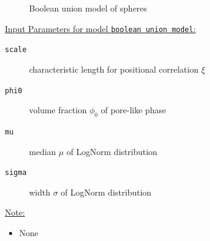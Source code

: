 \begin{figure}[htb]
\begin{center}
\hfill
{}
\end{center}
\caption{Boolean union model of spheres}
\label{fig:BooleanUnion}
\end{figure}


\underline{Input Parameters for model \texttt{boolean union model}:}\\
\begin{description}
\item[\texttt{scale}] characteristic length for positional correlation $\xi$
\item[\texttt{phi0}] volume fraction $\phi_0$ of pore-like phase
\item[\texttt{mu}] median $\mu$ of LogNorm distribution
\item[\texttt{sigma}] width $\sigma$ of LogNorm distribution
\end{description}

\vspace{5mm}

\underline{Note:}
\begin{itemize}
\item None
\end{itemize}


